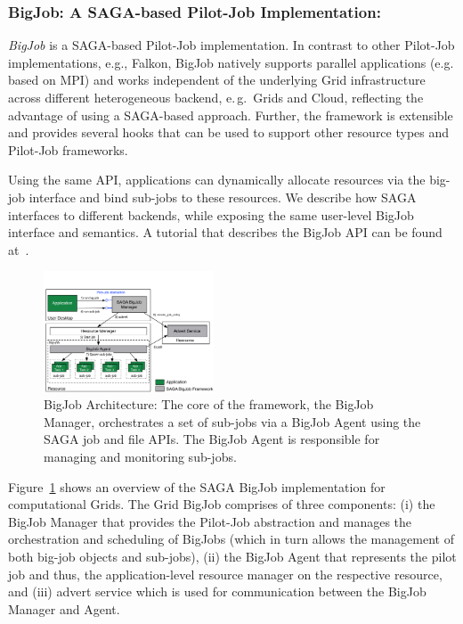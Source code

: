 \subsubsection{BigJob: A SAGA-based Pilot-Job Implementation:}

\emph{BigJob} is a SAGA-based Pilot-Job implementation. In contrast to
other Pilot-Job implementations, e.g., Falkon, BigJob natively
supports parallel applications (e.g. based on MPI) and works
independent of the underlying Grid infrastructure across different
heterogeneous backend, e.\,g.\ Grids and Cloud, reflecting the
advantage of using a SAGA-based approach. Further, the framework is
extensible and provides several hooks that can be used to support
other resource types and Pilot-Job frameworks.

Using the same API, applications can dynamically allocate resources
via the big-job interface and bind sub-jobs to these resources.  We
describe how SAGA interfaces to different backends, while exposing the
same user-level BigJob interface and semantics.  A tutorial that
describes the BigJob API can be found at~\cite{bigjob_cloud_tutorial}.

\begin{figure}[ht]
    \centering
    \includegraphics[width=0.45\textwidth]{figures/bigjob}
    \caption{BigJob Architecture: The core of the framework, the
      BigJob Manager, orchestrates a set of sub-jobs via a BigJob
      Agent using the SAGA job and file APIs.  The BigJob Agent is
      responsible for managing and monitoring sub-jobs.\up}
   \label{fig:figures_bigjob}
\end{figure}

\vspace{0.1in}
Figure~\ref{fig:figures_bigjob} shows an overview of the SAGA BigJob
implementation for computational Grids. The Grid BigJob comprises of
three components: (i) the BigJob Manager that provides the Pilot-Job
abstraction and manages the orchestration and scheduling of BigJobs
(which in turn allows the management of both big-job objects and
sub-jobs), (ii) the BigJob Agent that represents the pilot job and
thus, the application-level resource manager on the respective
resource, and (iii) advert service which is used for communication
between the BigJob Manager and Agent.


